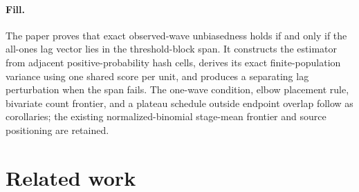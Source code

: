 \documentclass{article}
\begin{document}
\paragraph{Fill.} The paper proves that exact observed-wave unbiasedness holds if and only if the all-ones lag vector lies in the threshold-block span. It constructs the estimator from adjacent positive-probability hash cells, derives its exact finite-population variance using one shared score per unit, and produces a separating lag perturbation when the span fails. The one-wave condition, elbow placement rule, bivariate count frontier, and a plateau schedule outside endpoint overlap follow as corollaries; the existing normalized-binomial stage-mean frontier and source positioning are retained.

\section{Related work}
\end{document}
